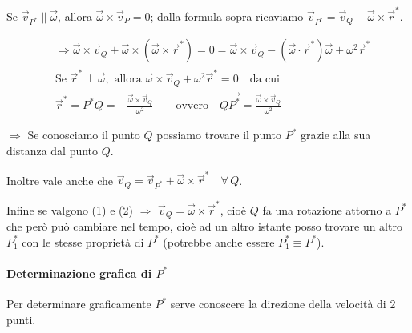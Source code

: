 Se $\vec{v}_{P^*} \parallel \vec{\omega}$, allora $\vec{\omega} \times \vec{v}_P = 0$; dalla formula sopra ricaviamo $\vec{v}_{P^*} = \vec{v}_Q - \vec{\omega} \times \vec{r}^*$.

\begin{align*}
&\Rightarrow \vec{\omega} \times \vec{v}_Q + \vec{\omega} \times (\vec{\omega} \times \vec{r}^*) = 0 = \vec{\omega} \times \vec{v}_Q - (\vec{\omega} \cdot \vec{r}^*)\vec{\omega} + \omega^2 \vec{r}^* \\
&\text{Se } \vec{r}^* \perp \vec{\omega}, \text{ allora } \vec{\omega} \times \vec{v}_Q + \omega^2 \vec{r}^* = 0 \quad \text{da cui} \\
&\vec{r}^* = P^*Q = -\frac{\vec{\omega} \times \vec{v}_Q}{\omega^2} \qquad \text{ovvero} \quad \overrightarrow{QP^*} = \frac{\vec{\omega} \times \vec{v}_Q}{\omega^2}
\end{align*}

$\Rightarrow$ Se conosciamo il punto $Q$ possiamo trovare il punto $P^*$ grazie alla sua distanza dal punto $Q$.

Inoltre vale anche che $\vec{v}_Q = \vec{v}_{P^*} + \vec{\omega} \times \vec{r}^* \quad \forall\, Q$.

Infine se valgono (1) e (2) $\Rightarrow$ $\vec{v}_Q = \vec{\omega} \times \vec{r}^*$, cioè $Q$ fa una rotazione attorno a $P^*$ che però può cambiare nel tempo, cioè ad un altro istante posso trovare un altro $P_1^*$ con le stesse proprietà di $P^*$ (potrebbe anche essere $P_1^* \equiv P^*$).

\paragraph{Determinazione grafica di $P^*$}
Per determinare graficamente $P^*$ serve conoscere la direzione della velocità di 2 punti.

